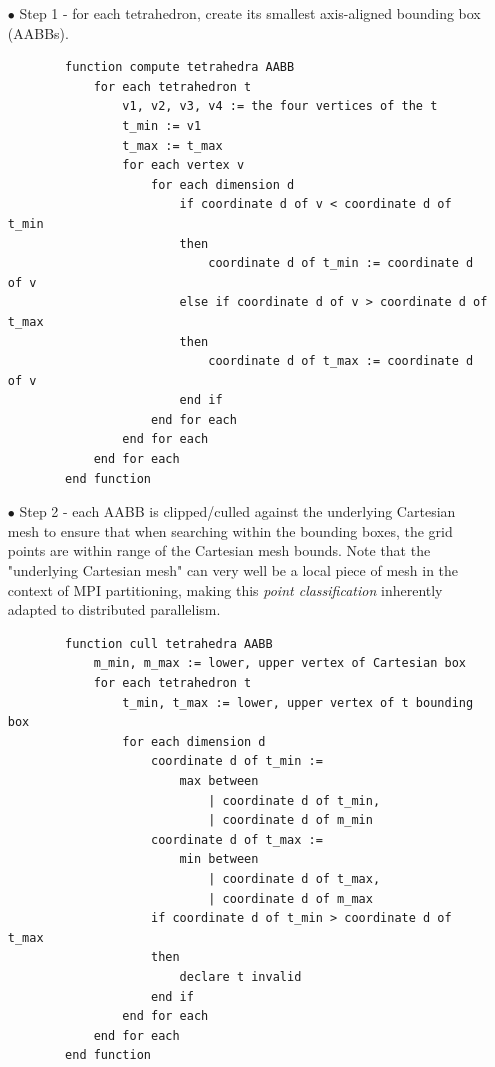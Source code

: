 \begin{itemize}
    \item[$\bullet$] Step 1 - for each tetrahedron, create its smallest axis-aligned bounding box (AABBs).

\begin{verbatim}
        function compute tetrahedra AABB
            for each tetrahedron t
                v1, v2, v3, v4 := the four vertices of the t
                t_min := v1
                t_max := t_max
                for each vertex v
                    for each dimension d
                        if coordinate d of v < coordinate d of t_min
                        then
                            coordinate d of t_min := coordinate d of v
                        else if coordinate d of v > coordinate d of t_max
                        then
                            coordinate d of t_max := coordinate d of v
                        end if
                    end for each
                end for each
            end for each
        end function
\end{verbatim}

    \item[$\bullet$] Step 2 - each AABB is clipped/culled against the underlying Cartesian mesh to ensure that when searching within the bounding boxes, the grid points are within range of the Cartesian mesh bounds. Note that the "underlying Cartesian mesh" can very well be a local piece of mesh in the context of MPI partitioning, making this \emph{point classification} inherently adapted to distributed parallelism.

\begin{verbatim}
        function cull tetrahedra AABB
            m_min, m_max := lower, upper vertex of Cartesian box
            for each tetrahedron t
                t_min, t_max := lower, upper vertex of t bounding box
                for each dimension d
                    coordinate d of t_min :=
                        max between
                            | coordinate d of t_min,
                            | coordinate d of m_min
                    coordinate d of t_max :=
                        min between
                            | coordinate d of t_max,
                            | coordinate d of m_max
                    if coordinate d of t_min > coordinate d of t_max
                    then
                        declare t invalid
                    end if
                end for each
            end for each
        end function
\end{verbatim}


\end{itemize}
